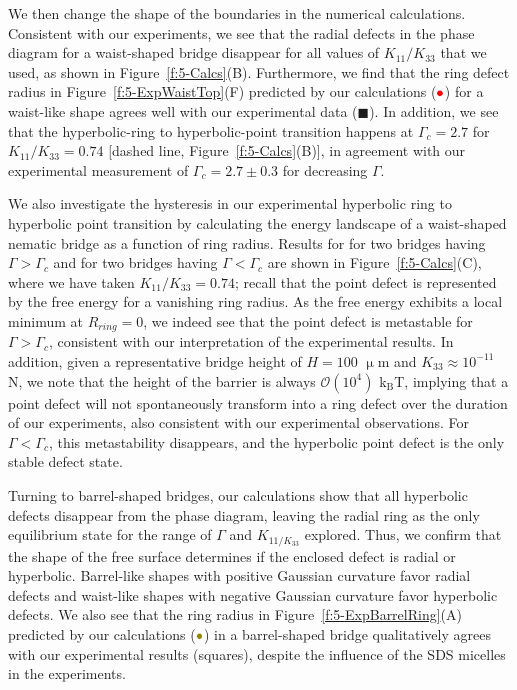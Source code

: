 We then change the shape of the boundaries in the numerical calculations.
Consistent with our experiments, we see that the radial defects in the phase diagram for a waist-shaped bridge disappear for all values of $K_{11}/K_{33}$ that we used, as shown in Figure~\ref{f:5-Calcs}(B).
Furthermore, we find that the ring defect radius in Figure~\ref{f:5-ExpWaistTop}(F) predicted by our calculations (${\color{red} \bullet}$) for a waist-like shape agrees well with our experimental data ($\blacksquare$).
In addition, we see that the hyperbolic-ring to hyperbolic-point transition happens at $\Gamma_c = 2.7$ for $K_{11}/K_{33} = 0.74$ [dashed line, Figure~\ref{f:5-Calcs}(B)], in agreement with our experimental measurement of $\Gamma_c = 2.7 \pm 0.3$ for decreasing $\Gamma$.

We also investigate the hysteresis in our experimental hyperbolic ring to hyperbolic point transition by calculating the energy landscape of a waist-shaped nematic bridge as a function of ring radius.
Results for for two bridges having $\Gamma > \Gamma_c$ and for two bridges having $\Gamma < \Gamma_c$ are shown in Figure~\ref{f:5-Calcs}(C), where we have taken $K_{11}/K_{33} = 0.74$; recall that the point defect is represented by the free energy for a vanishing ring radius.
As the free energy exhibits a local minimum at $R_{ring} = 0$, we indeed see that the point defect is metastable for $\Gamma > \Gamma_c$, consistent with our interpretation of the experimental results.
In addition, given a representative bridge height of $H = 100$ $\upmu$m and $K_{33} \approx 10^{-11}$ N, we note that the height of the barrier is always $\mathcal{O} \left ( 10^{4} \right )$ k$_\textrm{B}$T, implying that a point defect will not spontaneously transform into a ring defect over the duration of our experiments, also consistent with our experimental observations.
For $\Gamma < \Gamma_c$, this metastability disappears, and the hyperbolic point defect is the only stable defect state.

Turning to barrel-shaped bridges, our calculations show that all hyperbolic defects disappear from the phase diagram, leaving the radial ring as the only equilibrium state for the range of $\Gamma$ and $K_{11/K_{33}}$ explored.
Thus, we confirm that the shape of the free surface determines if the enclosed defect is radial or hyperbolic.
Barrel-like shapes with positive Gaussian curvature favor radial defects and waist-like shapes with negative Gaussian curvature favor hyperbolic defects.
We also see that the ring radius in Figure~\ref{f:5-ExpBarrelRing}(A) predicted by our calculations (${\color{olive} \bullet}$) in a barrel-shaped bridge qualitatively agrees with our experimental results (squares), despite the influence of the SDS micelles in the experiments.




